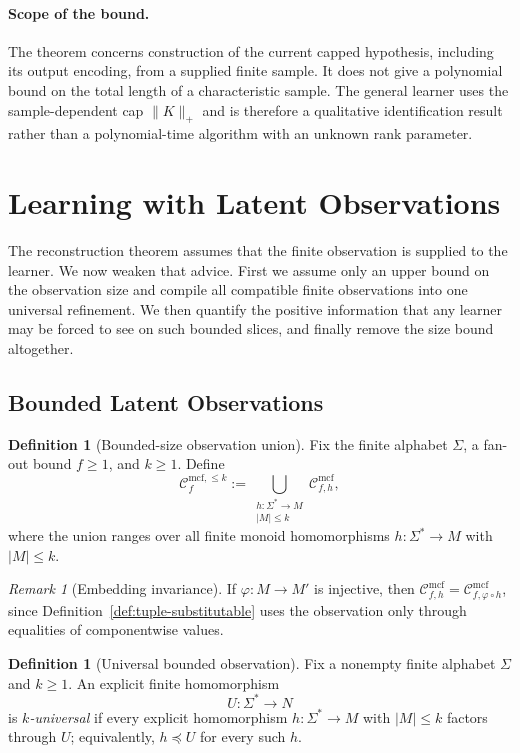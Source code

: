 \documentclass[11pt,a4paper]{article}
\numberwithin{equation}{section}
\theoremstyle{plain}
\theoremstyle{definition}
\newtheorem{definition}[theorem]{Definition}
\theoremstyle{remark}
\newtheorem{remark}[theorem]{Remark}
\newcommand{\Cmcf}[2]{\mathcal{C}^{\mathrm{mcf}}_{#1,#2}}
\newcommand{\Clatent}[2]{\mathcal{C}^{\mathrm{mcf},\le #2}_{#1}}
\begin{document}
\paragraph{Scope of the bound.}
The theorem concerns construction of the current capped hypothesis, including
its output encoding, from a supplied finite sample.  It does not give a
polynomial bound on the total length of a characteristic sample.  The general
learner uses the sample-dependent cap $\|K\|_+$ and is therefore a qualitative
identification result rather than a polynomial-time algorithm with an unknown
rank parameter.


\section{Learning with Latent Observations}
\label{sec:fixed-observation}

The reconstruction theorem assumes that the finite observation is supplied to
the learner.  We now weaken that advice.  First we assume only an upper bound
on the observation size and compile all compatible finite observations into one
universal refinement.  We then quantify the positive information that any
learner may be forced to see on such bounded slices, and finally remove the
size bound altogether.

\subsection{Bounded Latent Observations}
\begin{definition}[Bounded-size observation union]
\label{def:bounded-observation-union}
Fix the finite alphabet \(\Sigma\), a fan-out bound \(f\ge1\), and \(k\ge1\).
Define
\[
  \Clatent{f}{k}:=\bigcup_{\substack{h:\Sigma^*\to M\\ |M|\le k}} \Cmcf{f}{h},
\]
where the union ranges over all finite monoid homomorphisms
\(h:\Sigma^*\to M\) with \(|M|\le k\).
\end{definition}

\begin{remark}[Embedding invariance]
If \(\varphi:M\to M'\) is injective, then
\(\Cmcf{f}{h}=\Cmcf{f}{\varphi\circ h}\), since
Definition~\ref{def:tuple-substitutable} uses the observation only through
equalities of componentwise values.
\end{remark}

\begin{definition}[Universal bounded observation]
\label{def:universal-bounded-observation}
Fix a nonempty finite alphabet \(\Sigma\) and \(k\ge1\).  An explicit finite
homomorphism
\[
  U:\Sigma^*\to N
\]
is \emph{\(k\)-universal} if every explicit homomorphism
\(h:\Sigma^*\to M\) with \(|M|\le k\) factors through \(U\); equivalently,
\(h\preceq U\) for every such \(h\).
\end{definition}
\end{document}
